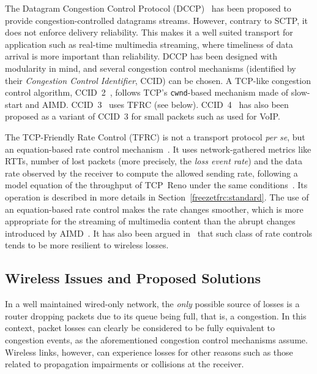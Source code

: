 \documentclass[twocolumn]{nictatechreport}
\newcommand{\latinlocution}[1]{\textit{#1}}
\newcommand{\perse}{\latinlocution{per se}}
\newcommand{\sysvar}[1]{\texttt{#1}}
\newcommand{\cwnd}{\sysvar{cwnd}}
\begin{document}
The Datagram Congestion Control Protocol (DCCP)~\cite{2006kohler_dccp,rfc4340}
has been proposed to provide congestion-controlled datagrams streams.  However,
contrary to SCTP, it does not enforce delivery reliability. This makes it
a well suited transport for application such as real-time multimedia streaming,
where timeliness of data arrival is more important than reliability.  DCCP has
been designed with modularity in mind, and several congestion control mechanisms
(identified by their \emph{Congestion Control Identifier}, CCID) can be chosen.
A TCP-like congestion control algorithm, CCID~2~\cite{rfc4341}, follows TCP's
\cwnd-based mechanism made of slow-start and AIMD.  CCID~3~\cite{rfc4342} uses
TFRC (see below). CCID~4~\cite{rfc5622} has also been proposed as a variant of
CCID~3 for small packets such as used for VoIP.

The TCP-Friendly Rate Control (TFRC) is not a transport protocol \perse, but an
equation-based rate control
mechanism~\cite{2000floyd_equation-based_unicast,2003widmer_equation-based_unicast_multicast,rfc5348}.
It uses network-gathered metrics like RTTs, number of lost packets (more
precisely, the \emph{loss event rate}) and the data rate observed by the
receiver to compute the allowed sending rate, following a model equation of the
throughput of TCP\ Reno under the same
conditions~\cite{1998padhye_tcp_model}. Its operation is described in more
details in Section~\ref{freezetfrc:standard}. The use of an equation-based rate
control makes the rate changes smoother, which is more appropriate for the
streaming of multimedia content than the abrupt changes introduced by
AIMD~\cite{rfc5348}. It has also been argued
in~\cite{2004chen_rate-based_ad-hoc} that such class of rate controls tends to
be more resilient to wireless losses.

\subsection{Wireless Issues and Proposed Solutions}

In a well maintained wired-only network, the \emph{only} possible source of
losses is a router dropping packets due to its queue being full, that is, a
congestion. In this context, packet losses can clearly be considered to be fully
equivalent to congestion events, as the aforementioned congestion control
mechanisms assume.  Wireless links, however, can experience losses for other
reasons such as those related to propagation impairments or collisions at the receiver.
\end{document}
